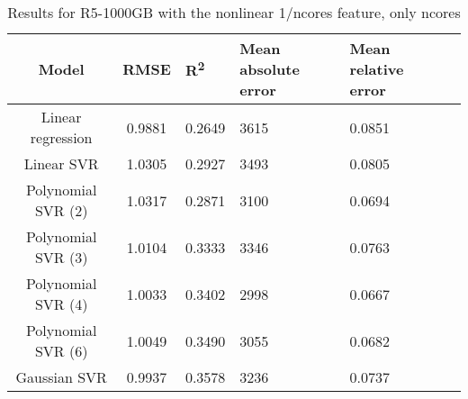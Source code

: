 \begin{table}[H]
\centering
\begin{adjustbox}{center}
\begin{tabular}{c | c M{1.2cm} M{2.5cm} M{2.5cm} M{1.8cm}}
Model & RMSE & R\textsuperscript{2} & Mean absolute error & Mean relative error \tabularnewline
\hline
Linear regression & 0.9881 & 0.2649 &   3615 & 0.0851 \\
Linear SVR & 1.0305 & 0.2927 &   3493 & 0.0805 \\
Polynomial SVR (2) & 1.0317 & 0.2871 &   3100 & 0.0694 \\
Polynomial SVR (3) & 1.0104 & 0.3333 &   3346 & 0.0763 \\
Polynomial SVR (4) & 1.0033 & 0.3402 &   2998 & 0.0667 \\
Polynomial SVR (6) & 1.0049 & 0.3490 &   3055 & 0.0682 \\
Gaussian SVR & 0.9937 & 0.3578 &   3236 & 0.0737 \\
\end{tabular}
\end{adjustbox}
\\
\caption{Results for R5-1000GB with the nonlinear 1/ncores feature, only ncores}
\label{tab:all_nonlinear_R5_1000}
\end{table}
